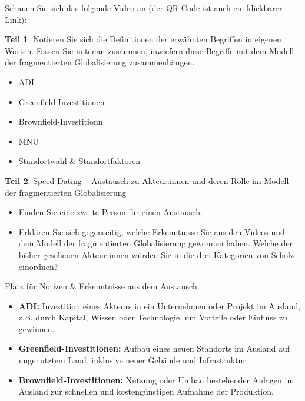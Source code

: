 \begin{myexercise}[ADI]
    Schauen Sie sich das folgende Video an (der QR-Code ist auch ein klickbarer Link):


    \textbf{Teil 1}: Notieren Sie sich die Definitionen der erwähnten Begriffen in eigenen Worten. Fassen Sie untenan zusammen, inwiefern diese Begriffe mit dem Modell der fragmentierten Globalisierung zusammenhängen.
    \begin{itemize}
        \item \gls{ADI}
        \item Greenfield-Investitionen
        \item Brownfield-Investitionn
        \item \gls{MNU}
        \item Standortwahl \& Standortfaktoren
    \end{itemize}
    \textbf{Teil 2}: Speed-Dating – Austausch zu Akteur:innen und deren Rolle im Modell der fragmentierten Globalisierung

    \begin{itemize}
        \item Finden Sie eine zweite Person für einen Austausch.
        \item Erklären Sie sich gegenseitig, welche Erkenntnisse Sie aus den Videos und dem Modell der fragmentierten Globalisierung gewonnen haben. Welche der bisher gesehenen Akteur:innen würden Sie in die drei Kategorien von Scholz einordnen?
    \end{itemize}
    Platz für Notizen \& Erkenntnisse aus dem Austausch:

    \begin{myanswer}
        \begin{itemize}
            \item \textbf{\gls{ADI}:}
                  Investition eines Akteurs in ein Unternehmen oder Projekt im Ausland, z.B. durch Kapital, Wissen oder Technologie, um Vorteile oder Einfluss zu gewinnen.

            \item \textbf{Greenfield-Investitionen:}
                  Aufbau eines neuen Standorts im Ausland auf ungenutztem Land, inklusive neuer Gebäude und Infrastruktur.

            \item \textbf{Brownfield-Investitionen:}
                  Nutzung oder Umbau bestehender Anlagen im Ausland zur schnellen und kostengünstigen Aufnahme der Produktion.


\end{itemize}
\end{myanswer}
\end{myexercise}
